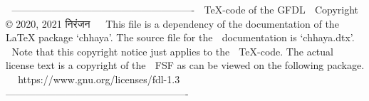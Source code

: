 ^^A -------------------------------------------------------
^^A TeX-code of the GFDL
^^A Copyright © 2020, 2021 निरंजन
^^A
^^A This file is a dependency of the documentation of the
^^A LaTeX package `chhaya'. The source file for the
^^A documentation is `chhaya.dtx'.
^^A
^^A Note that this copyright notice just applies to the
^^A TeX-code. The actual license text is a copyright of the
^^A FSF as can be viewed on the following package.
^^A
^^A https://www.gnu.org/licenses/fdl-1.3
^^A -------------------------------------------------------
% 
% 
% 
% 
% 
% 
% 
% 
% 
% 
% 

